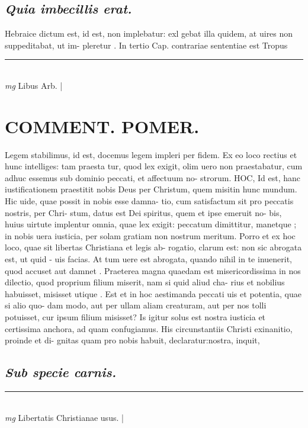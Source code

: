 \documentclass{article}
\begin{document}
\begin{pages}
\subsection*{\textit{Quia imbecillis erat. }}\pstart Hebraice dictum est, id est, non implebatur: exl gebat illa quidem, at uires non suppeditabat, ut im- pleretur . In tertio Cap. contrariae sententiae est Tropus  \pend
\vspace{0.5cm}\noindent
\vspace{0.2cm}\rule{1cm}{0.2pt}\\ 
\hspace{0.2cm}\textit{mg}
\footnotesize Libus Arb.  
\normalsize| 
\section*{COMMENT. POMER.  }\pstart Legem stabilimus, id est, docemus legem impleri per fidem. Ex eo loco rectius et hunc intelliges: tam praesta tur, quod lex exigit, olim uero non praestabatur, cum adhuc essemus sub dominio peccati, et affectuum no- strorum. HOC, Id est, hanc iustificationem praestitit nobis Deus per Christum, quem misitin hunc mundum. Hic uide, quae possit in nobis esse damna- tio, cum satisfactum sit pro peccatis nostris, per Chri- stum, datus est Dei spiritus, quem et ipse emeruit no- bis, huius uirtute implentur omnia, quae lex exigit: peccatum dimittitur, manetque ; in nobis uera iusticia, per solam gratiam non nostrum meritum. Porro et ex hoc loco, quae sit libertas Christiana et legis ab- rogatio, clarum est: non sic abrogata est, ut quid - uis facias. At tum uere est abrogata, quando nihil in te inuenerit, quod accuset aut damnet . Praeterea magna quaedam est misericordissima in nos dilectio, quod proprium filium miserit, nam si quid aliud cha- rius et nobilius habuisset, misisset utique . Est et in hoc aestimanda peccati uis et potentia, quae si alio quo- dam modo, aut per ullam aliam creaturam, aut per nos tolli potuisset, cur ipsum filium misisset? Is igitur solus est nostra iusticia et certissima anchora, ad quam confugiamus.   \pend\pstart His circunstantiis Christi exinanitio, proinde et di- gnitas quam pro nobis habuit, declaratur:nostra, inquit,  \pend
{}
{}
\subsection*{\textit{Sub specie carnis. }}
\vspace{0.5cm}\noindent
\vspace{0.2cm}\rule{1cm}{0.2pt}\\ 
\hspace{0.2cm}\textit{mg}
\footnotesize Libertatis Christianae usus.  
\normalsize| 

\end{pages}
\end{document}
